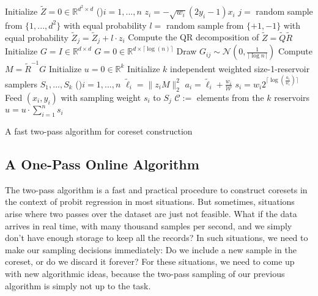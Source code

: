 \begin{algorithm}
    \DontPrintSemicolon
    Initialize $\tilde{Z} = 0 \in \mathbb{R}^{d^2 \times d}$ \;
    \For(){$i = 1,...,n$}{
        $z_i = -\sqrt{w_i}(2y_i - 1)x_i$
        $j = $ random sample from $\{1, ..., d^2\}$ with equal probability \;
        $l = $ random sample from $\{+1, -1\}$ with equal probability \;
        $\tilde{Z}_j = \tilde{Z}_j + l \cdot z_i$
    }
    Compute the QR decomposition of $\tilde{Z} = \tilde{Q}\tilde{R}$ \;
    Initialize $G = I \in \mathbb{R}^{d \times d}$ \;
     {
        $G = 0 \in \mathbb{R}^{d \times \lceil\log(n)\rceil}$ \;
        Draw $G_{ij} \sim \mathcal{N}(0, \frac{1}{\lceil\log{n}\rceil})$
    }
    Compute $M = \tilde{R}^{-1} G$ \;
    Initialize $u = 0 \in \mathbb{R}^k$
    Initialize $k$ independent weighted size-1-reservoir samplers $S_1, ..., S_k$ \;
    \For(){$i = 1, ..., n$}{
        $\tilde{\ell}_i = \lVert z_i M\rVert_2^2$
        $a_i = \tilde{\ell}_i + \frac{w_i}{\mathcal{W}}$
        $s_i = w_i 2^{\lceil\log(\frac{a_i}{w_i})\rceil}$
         {
            Feed $(x_i, y_i)$ with sampling weight $s_i$ to $S_j$ \;
        }
    }
    $\mathcal{C} := $ elements from the $k$ reservoirs \;
    $u = u \cdot \sum_{i=1}^n s_i$
    \caption{A fast two-pass algorithm for coreset construction\label{algo:two-pass}}
\end{algorithm}

\subsection{A One-Pass Online Algorithm}

The two-pass algorithm is a fast and practical procedure to
construct coresets in the context of probit regression in most
situations. But sometimes, situations arise where two passes
over the dataset are just not feasible.
What if the data arrives in real time, with many thousand
samples per second, and we simply don't
have enough storage to keep all the records?
In such situations, we need to make our sampling decisions
immediately: Do we include a new sample in the coreset, or
do we discard it forever?
For these situations, we need to come up with new algorithmic
ideas, because the two-pass sampling of our previous algorithm
is simply not up to the task.

